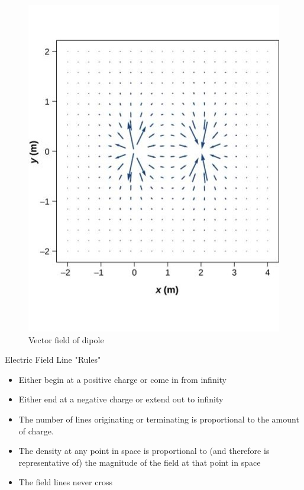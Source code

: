 \documentclass[14pt]{memoir}
\begin{document}
\begin{figure}[H]
\begin{center}
\includegraphics[scale=0.60]{fig/fig_05_28.jpg}
\caption{Vector field of dipole}
\label{fig:05_28}
\end{center}
\end{figure}

Electric Field Line "Rules"

\begin{itemize}
\item Either begin at a positive charge or come in from infinity
\item Either end at a negative charge or extend out to infinity
\item The number of lines originating or terminating is proportional to the amount of charge.
\item The density at any point in space is proportional to (and therefore is representative of) the magnitude of the field at that point in space 
\item The field lines never cross
\end{itemize}
\end{document}
